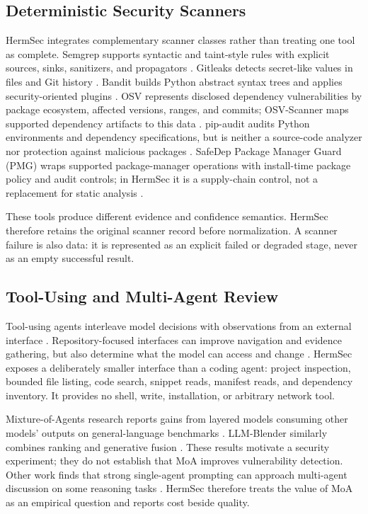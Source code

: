 \documentclass[sigconf,nonacm]{acmart}
\begin{document}
\subsection{Deterministic Security Scanners}
HermSec integrates complementary scanner classes rather than treating one tool as complete. Semgrep supports syntactic and taint-style rules with explicit sources, sinks, sanitizers, and propagators \cite{semgrepdocs}. Gitleaks detects secret-like values in files and Git history \cite{gitleaksdocs}. Bandit builds Python abstract syntax trees and applies security-oriented plugins \cite{banditdocs}. OSV represents disclosed dependency vulnerabilities by package ecosystem, affected versions, ranges, and commits; OSV-Scanner maps supported dependency artifacts to this data \cite{osvschema,osvscannerdocs}. pip-audit audits Python environments and dependency specifications, but is neither a source-code analyzer nor protection against malicious packages \cite{pipauditdocs}. SafeDep Package Manager Guard (PMG) wraps supported package-manager operations with install-time package policy and audit controls; in HermSec it is a supply-chain control, not a replacement for static analysis \cite{pmgdocs}.

These tools produce different evidence and confidence semantics. HermSec therefore retains the original scanner record before normalization. A scanner failure is also data: it is represented as an explicit failed or degraded stage, never as an empty successful result.

\subsection{Tool-Using and Multi-Agent Review}
Tool-using agents interleave model decisions with observations from an external interface \cite{yao2023react}. Repository-focused interfaces can improve navigation and evidence gathering, but also determine what the model can access and change \cite{yang2024sweagent}. HermSec exposes a deliberately smaller interface than a coding agent: project inspection, bounded file listing, code search, snippet reads, manifest reads, and dependency inventory. It provides no shell, write, installation, or arbitrary network tool.

Mixture-of-Agents research reports gains from layered models consuming other models' outputs on general-language benchmarks \cite{wang2025moa}. LLM-Blender similarly combines ranking and generative fusion \cite{jiang2023blender}. These results motivate a security experiment; they do not establish that MoA improves vulnerability detection. Other work finds that strong single-agent prompting can approach multi-agent discussion on some reasoning tasks \cite{wang2024rethinking}. HermSec therefore treats the value of MoA as an empirical question and reports cost beside quality.
\end{document}
